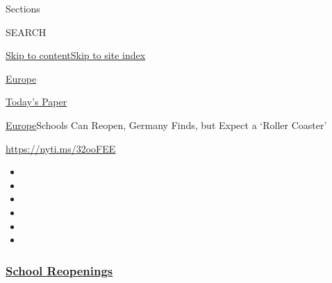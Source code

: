 Sections

SEARCH

\protect\hyperlink{site-content}{Skip to
content}\protect\hyperlink{site-index}{Skip to site index}

\href{https://www.nytimes3xbfgragh.onion/section/world/europe}{Europe}

\href{https://myaccount.nytimes3xbfgragh.onion/auth/login?response_type=cookie\&client_id=vi}{}

\href{https://www.nytimes3xbfgragh.onion/section/todayspaper}{Today's
Paper}

\href{/section/world/europe}{Europe}\textbar{}Schools Can Reopen,
Germany Finds, but Expect a `Roller Coaster'

\url{https://nyti.ms/32ooFEE}

\begin{itemize}
\item
\item
\item
\item
\item
\item
\end{itemize}

\hypertarget{school-reopenings}{%
\subsubsection{\texorpdfstring{\href{https://www.nytimes3xbfgragh.onion/spotlight/schools-reopening?name=styln-coronavirus-schools-reopening\&region=TOP_BANNER\&block=storyline_menu_recirc\&action=click\&pgtype=Article\&impression_id=1579b560-f2bd-11ea-8255-47bcf7935a1c\&variant=undefined}{School
Reopenings}}{School Reopenings}}\label{school-reopenings}}

